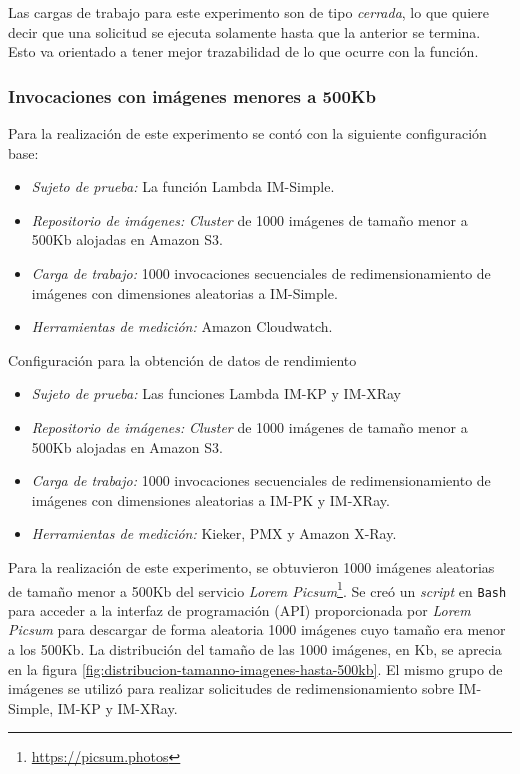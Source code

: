 Las cargas de trabajo para este experimento son de tipo \emph{cerrada}, lo que quiere decir que una solicitud se ejecuta solamente hasta que la anterior se termina. Esto va orientado a tener mejor trazabilidad de lo que ocurre con la función.


\subsubsection{Invocaciones con imágenes menores a 500Kb}
Para la realización de este experimento se contó con la siguiente configuración base:
\begin{itemize}
    \item \emph{Sujeto de prueba:} La función Lambda IM-Simple.
    \item \emph{Repositorio de imágenes:} \emph{Cluster} de 1000 imágenes de tamaño menor a 500Kb alojadas en Amazon S3.     
    \item \emph{Carga de trabajo:} 1000 invocaciones secuenciales de redimensionamiento de imágenes con dimensiones aleatorias a IM-Simple.
    \item \emph{Herramientas de medición:} Amazon Cloudwatch.
\end{itemize}

Configuración para la obtención de datos de rendimiento

\begin{itemize}
    \item \emph{Sujeto de prueba:} Las funciones Lambda IM-KP y IM-XRay
    \item \emph{Repositorio de imágenes:} \emph{Cluster} de 1000 imágenes de tamaño menor a 500Kb alojadas en Amazon S3.     
    \item \emph{Carga de trabajo:} 1000 invocaciones secuenciales de redimensionamiento de imágenes con dimensiones aleatorias a IM-PK y IM-XRay.
    \item \emph{Herramientas de medición:} Kieker, PMX y Amazon X-Ray.
\end{itemize}

Para la realización de este experimento, se obtuvieron 1000 imágenes aleatorias de tamaño menor a 500Kb del servicio \emph{Lorem Picsum}\footnote{\url{https://picsum.photos}}. Se creó un \emph{script} en \texttt{Bash} para acceder a la interfaz de programación (API) proporcionada por \emph{Lorem Picsum} para descargar de forma aleatoria 1000 imágenes cuyo tamaño era menor a los 500Kb. La distribución del tamaño de las 1000 imágenes, en Kb, se aprecia en la figura \ref{fig:distribucion-tamanno-imagenes-hasta-500kb}. El mismo grupo de imágenes se utilizó para realizar solicitudes de redimensionamiento sobre IM-Simple, IM-KP y IM-XRay.

